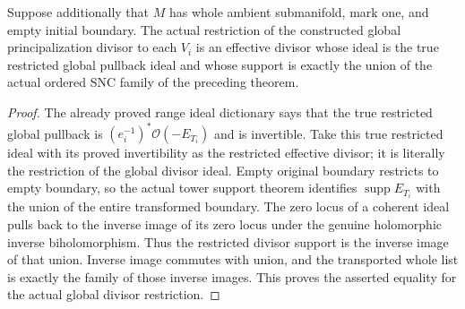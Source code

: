 \begin{theorem}
\label{hir:original-global-principalization-range-divisor-snc-support}
\leanok
{}
Suppose additionally that $M$ has whole ambient submanifold, mark one,
and empty initial boundary.  The actual restriction of the constructed
global principalization divisor to each $V_i$ is an effective divisor
whose ideal is the true restricted global pullback ideal and whose
support is exactly the union of the actual ordered SNC family of the
preceding theorem.
\end{theorem}
\begin{proof}
The already proved range ideal dictionary says that the true restricted
global pullback is $(e_i^{-1})^*\mathcal O(-E_{T_i})$ and is invertible.
Take this true restricted ideal with its proved invertibility as the
restricted effective divisor; it is literally the restriction of the
global divisor ideal.  Empty original boundary restricts to empty
boundary, so the actual tower support theorem identifies
$\operatorname{supp}E_{T_i}$ with the union of the entire transformed
boundary.  The zero locus of a coherent ideal pulls back to the inverse
image of its zero locus under the genuine holomorphic inverse
biholomorphism.  Thus the restricted divisor support is the inverse image
of that union.  Inverse image commutes with union, and the transported
whole list is exactly the family of those inverse images.  This proves
the asserted equality for the actual global divisor restriction.
\end{proof}

